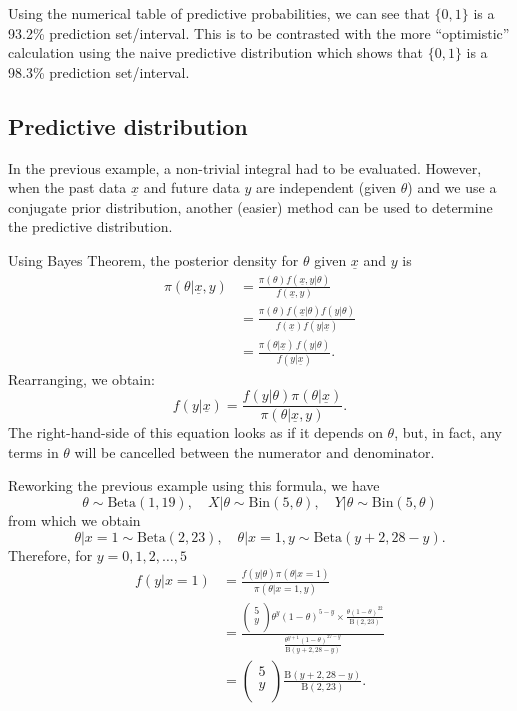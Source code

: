 Using the numerical table of predictive probabilities, we can see that
$\{0,1\}$ is a 93.2\% prediction set/interval. This is to be
contrasted with the more ``optimistic'' calculation using the naive
predictive distribution which shows that $\{0,1\}$ is a 98.3\%
prediction set/interval.

\clearpage

\subsection*{Predictive distribution}
In the previous example, a non-trivial integral had to be evaluated.
However, when the past data $\underline{x}$ and future data $y$ are
independent (given $\theta$) and we use a conjugate prior
distribution, another (easier) method can be used to determine the
predictive distribution.

Using Bayes Theorem, the posterior density for $\theta$ given
$\underline{x}$ and $y$ is
\begin{align*}
\pi(\theta|\underline{x},y)&=\frac{\pi(\theta)f(\underline{x},y|\theta)}{f(\underline{x},y)}\\
&=\frac{\pi(\theta)f(\underline{x}|\theta)f(y|\theta)}{f(\underline{x})f(y|\underline{x})}
\\
&=\frac{\pi(\theta|\underline{x})\,f(y|\theta)}{f(y|\underline{x})}.
\end{align*}
Rearranging, we obtain:
$$f(y|\underline{x}) =\frac{f(y|\theta)\pi(\theta|\underline{x})}{\pi(\theta|\underline{x},y)}.$$
The right-hand-side of this equation looks as if it depends on
$\theta$, but, in fact, any terms in $\theta$ will be cancelled
between the numerator and denominator.

Reworking the previous example using this formula, we have
$$
\theta\sim \text{Beta}(1,19),\quad X|\theta\sim \text{Bin}(5,\theta),\quad 
Y|\theta\sim \text{Bin}(5,\theta)
$$
from which we obtain
$$
\theta|x=1\sim \text{Beta}(2,23),\quad \theta|x=1,y\sim \text{Beta}(y+2,28-y).
$$
Therefore, for $y=0,1,2,\ldots,5$
\begin{align*}
f(y|x=1)&=\frac{f(y|\theta)\pi(\theta|x=1)}{\pi(\theta|x=1,y)}\\
{}
&=\frac{\begin{pmatrix} 5 \\ y \\ \end{pmatrix} 
\theta^y(1-\theta)^{5-y}
\times \frac{\theta(1-\theta)^{22}}{\mathrm{B}(2,23)}}
{\frac{\theta^{y+1}(1-\theta)^{27-y}}{\mathrm{B}(y+2,28-y)}}\\ 
{}
&=\begin{pmatrix} 5 \\ y \\ \end{pmatrix} \frac{\mathrm{B}(y+2,28-y)}{\mathrm{B}(2,23)}.
\end{align*}

